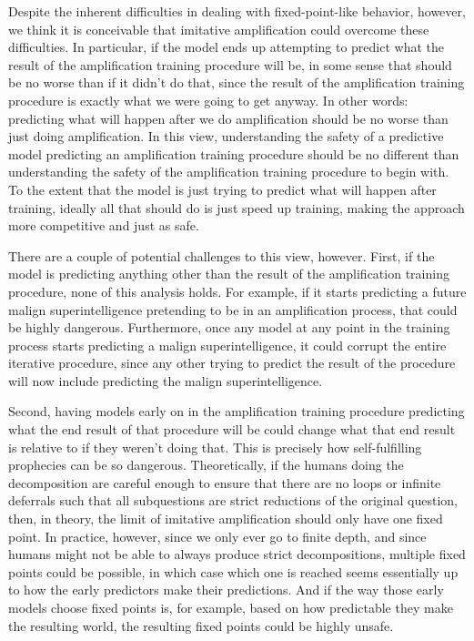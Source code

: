 {{Despite the inherent difficulties in dealing with fixed-point-like behavior, however, we think it is conceivable that imitative amplification could overcome these difficulties. In particular, if the model ends up attempting to predict what the result of the amplification training procedure will be, in some sense that should be no worse than if it didn't do that, since the result of the amplification training procedure is exactly what we were going to get anyway. In other words: predicting what will happen after we do amplification should be no worse than just doing amplification. In this view, understanding the safety of a predictive model predicting an amplification training procedure should be no different than understanding the safety of the amplification training procedure to begin with. To the extent that the model is just trying to predict what will happen after training, ideally all that should do is just speed up training, making the approach more competitive and just as safe.

There are a couple of potential challenges to this view, however. First, if the model is predicting anything other than the result of the amplification training procedure, none of this analysis holds. For example, if it starts predicting a future malign superintelligence pretending to be in an amplification process, that could be highly dangerous. Furthermore, once any model at any point in the training process starts predicting a malign superintelligence, it could corrupt the entire iterative procedure, since any other trying to predict the result of the procedure will now include predicting the malign superintelligence.

Second, having models early on in the amplification training procedure predicting what the end result of that procedure will be could change what that end result is relative to if they weren't doing that. This is precisely how self-fulfilling prophecies can be so dangerous. Theoretically, if the humans doing the decomposition are careful enough to ensure that there are no loops or infinite deferrals such that all subquestions are strict reductions of the original question, then, in theory, the limit of imitative amplification should only have one fixed point. In practice, however, since we only ever go to finite depth, and since humans might not be able to always produce strict decompositions, multiple fixed points could be possible, in which case which one is reached seems essentially up to how the early predictors make their predictions. And if the way those early models choose fixed points is, for example, based on how predictable they make the resulting world, the resulting fixed points could be highly unsafe.





}}
